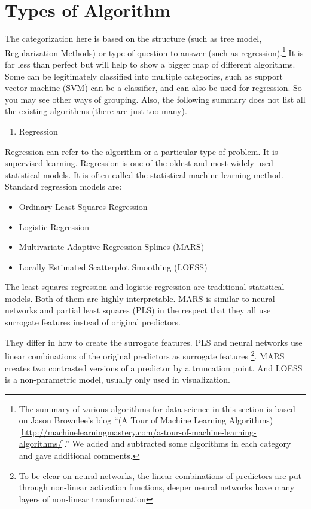 \documentclass[12pt,]{krantz}
\providecommand{\tightlist}{%
  \setlength{\itemsep}{0pt}\setlength{\parskip}{0pt}}
\theoremstyle{definition}
\theoremstyle{definition}
\theoremstyle{remark}
\begin{document}
\section{Types of Algorithm}\label{types-of-algorithm}

The categorization here is based on the structure (such as tree model,
Regularization Methods) or type of question to answer (such as
regression).\footnote{The summary of various algorithms for data science
  in this section is based on Jason Brownlee's blog ``(A Tour of Machine
  Learning
  Algorithms){[}\url{http://machinelearningmastery.com/a-tour-of-machine-learning-algorithms/}{]}.''
  We added and subtracted some algorithms in each category and gave
  additional comments.} It is far less than perfect but will help to
show a bigger map of different algorithms. Some can be legitimately
classified into multiple categories, such as support vector machine
(SVM) can be a classifier, and can also be used for regression. So you
may see other ways of grouping. Also, the following summary does not
list all the existing algorithms (there are just too many).

\begin{enumerate}
\def\labelenumi{\arabic{enumi}.}
\tightlist
\item
  Regression
\end{enumerate}

Regression can refer to the algorithm or a particular type of problem.
It is supervised learning. Regression is one of the oldest and most
widely used statistical models. It is often called the statistical
machine learning method. Standard regression models are:

\begin{itemize}
\tightlist
\item
  Ordinary Least Squares Regression
\item
  Logistic Regression
\item
  Multivariate Adaptive Regression Splines (MARS)
\item
  Locally Estimated Scatterplot Smoothing (LOESS)
\end{itemize}

The least squares regression and logistic regression are traditional
statistical models. Both of them are highly interpretable. MARS is
similar to neural networks and partial least squares (PLS) in the
respect that they all use surrogate features instead of original
predictors.

They differ in how to create the surrogate features. PLS and neural
networks use linear combinations of the original predictors as surrogate
features \footnote{To be clear on neural networks, the linear
  combinations of predictors are put through non-linear activation
  functions, deeper neural networks have many layers of non-linear
  transformation}. MARS creates two contrasted versions of a predictor
by a truncation point. And LOESS is a non-parametric model, usually only
used in visualization.
\end{document}
